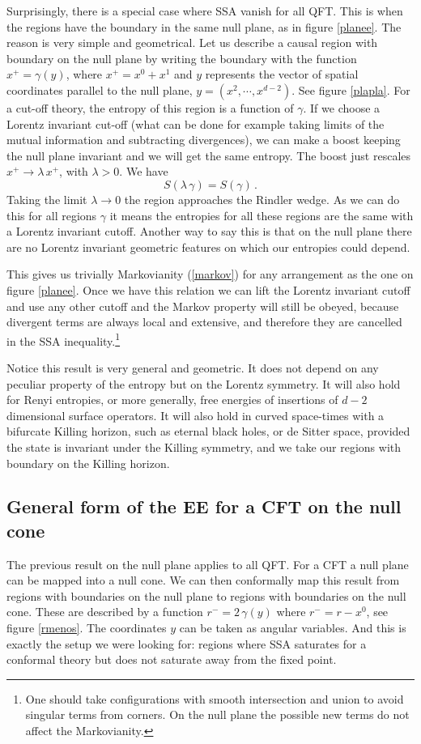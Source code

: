 \documentclass[12pt]{article}
\numberwithin{equation}{section}
\newcommand{\be}{\begin{equation}}
\newcommand{\ee}{\end{equation}}
\begin{document}
Surprisingly, there is a special case where SSA vanish for all QFT. This is when the regions have the boundary in the same null plane, as in figure \ref{planee}.   
 The reason is very simple and geometrical. Let us describe a causal region with boundary on the null plane by writing the boundary with the function $x^+=\gamma(y)$, where $x^+=x^0+x^1$ and $y$ represents the vector of spatial coordinates parallel to the null plane, $y=(x^2,\cdots,x^{d-2})$. See figure \ref{plapla}. For a cut-off theory, the entropy of this region is a function of $\gamma$. If we choose a Lorentz invariant cut-off (what can be done for example taking limits of the mutual information and subtracting divergences), we can make a boost keeping the null plane invariant and we will get the same entropy. The boost just rescales $x^+\rightarrow \lambda\, x^+$, with $\lambda>0$. We have
 \be
 S(\lambda \,\gamma)=S(\gamma)\,.
\ee 
Taking the limit $\lambda\rightarrow 0$ the region approaches the Rindler wedge. As we can do this for all regions $\gamma$ it means the entropies for all these regions are the same with a Lorentz invariant cutoff. Another way to say this is that on the null plane there are no Lorentz invariant geometric features on which our entropies could depend. 

This gives us trivially Markovianity (\ref{markov}) for any arrangement as the one on figure \ref{planee}. Once we have this relation we can lift the Lorentz invariant cutoff and use any other cutoff and the Markov property will still be obeyed, because divergent terms are always local and extensive, and therefore they are cancelled in the SSA inequality.\footnote{One should take configurations with smooth intersection and union to avoid singular terms from corners. On the null plane the possible new terms do not affect the Markovianity.}  

Notice this result is very general and geometric. It does not depend on any peculiar property of the entropy but on the Lorentz symmetry. It will also hold for Renyi entropies, or more generally, free energies of insertions of $d-2$ dimensional surface operators. It will also hold in curved space-times with a bifurcate Killing horizon, such as eternal black holes, or de Sitter space, provided the state is invariant under the Killing symmetry, and we take our regions with boundary on the Killing horizon.   




\subsection{General form of the EE for a CFT on the null cone}
The previous result on the null plane applies to all QFT. For a CFT a null plane can be mapped into a null cone. We can then conformally map this result from regions with boundaries on the null plane to regions with boundaries on the null cone. These are described by a function $r^-=2 \,\gamma(y)$ where $r^-=r-x^0$, see figure \ref{rmenos}. The coordinates $y$ can be taken as angular variables. 
 And this is exactly the setup we were looking for: regions where SSA saturates for a conformal theory but does not saturate away from the fixed point. 
\end{document}
